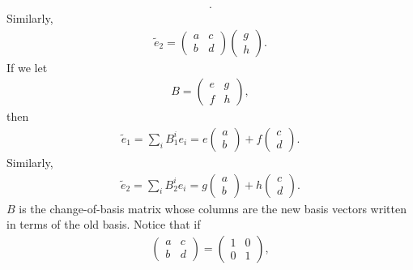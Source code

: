 \documentclass{report}
\begin{document}
\begin{itemize}
\begin{align*}
            .\end{align*}
            Similarly,
            \begin{align*}
                \tilde{e}_{2} = \begin{pmatrix} a & c \\ b & d  \end{pmatrix} \begin{pmatrix} g \\ h \end{pmatrix}
            .\end{align*}
            If we let
            \begin{align*}
                B = \begin{pmatrix} e & g \\ f & h \end{pmatrix}
            ,\end{align*}
            then
            \begin{align*}
                \tilde{e}_{1} = \sum_{i}B_{1}^{i}e_{i} = e \begin{pmatrix} a \\ b \end{pmatrix} + f \begin{pmatrix} c \\ d \end{pmatrix}
            .\end{align*}
            Similarly,
            \begin{align*}
                \tilde{e}_{2} = \sum_{i}B_{2}^{i}e_{i} = g \begin{pmatrix} a \\ b \end{pmatrix} + h \begin{pmatrix} c \\ d \end{pmatrix}
            .\end{align*}
            $B$ is the change-of-basis matrix whose columns are the new basis vectors written in terms of the old basis.
            \bigbreak \noindent 
            Notice that if 
            \begin{align*}
                \begin{pmatrix} a & c \\ b & d  \end{pmatrix} = \begin{pmatrix} 1 & 0 \\ 0 & 1 \end{pmatrix}
            ,\end{align*}

\end{itemize}
\end{document}
